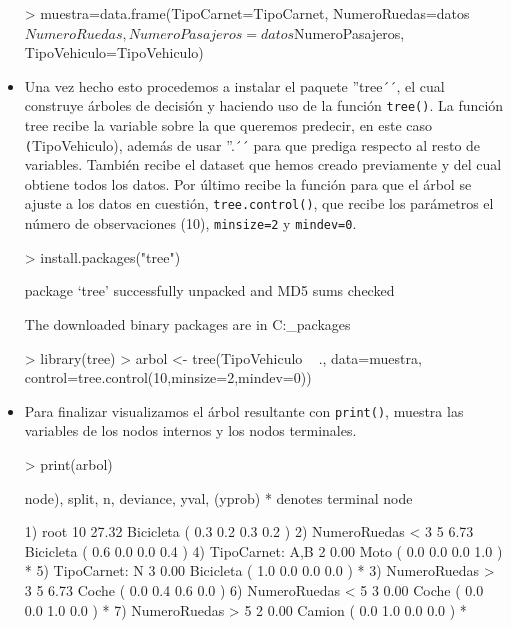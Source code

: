 \documentclass[a4paper, 12pt]{article}
\begin{document}
\begin{itemize}
\begin{Schunk}
\begin{Sinput}
> muestra=data.frame(TipoCarnet=TipoCarnet, NumeroRuedas=datos$NumeroRuedas, NumeroPasajeros=datos$NumeroPasajeros, TipoVehiculo=TipoVehiculo)
\end{Sinput}
\end{Schunk}
    \item Una vez hecho esto procedemos a instalar el paquete ''tree´´, el cual construye árboles de decisión y haciendo uso de la función \texttt{tree()}. La función tree recibe la variable sobre la que queremos predecir, en este caso \texttt(TipoVehiculo), además de usar ''.´´ para que prediga respecto al resto de variables. También recibe el dataset que hemos creado previamente y del cual obtiene todos los datos. Por último recibe la función para que el árbol se ajuste a los datos en cuestión, \texttt{tree.control()}, que recibe los parámetros el número de observaciones (10), \texttt{minsize=2} y \texttt{mindev=0}.
\begin{Schunk}
\begin{Sinput}
> install.packages("tree")
\end{Sinput}
\begin{Soutput}
package ‘tree’ successfully unpacked and MD5 sums checked

The downloaded binary packages are in
	C:\Users{}\AppData\Local\Temp\RtmpemczRZ\downloaded_packages
\end{Soutput}
\begin{Sinput}
> library(tree)
> arbol <- tree(TipoVehiculo ~ ., data=muestra, control=tree.control(10,minsize=2,mindev=0))
\end{Sinput}
\end{Schunk}
		\item Para finalizar visualizamos el árbol resultante con \texttt{print()}, muestra las variables de los nodos internos y  los nodos terminales.
\begin{Schunk}
\begin{Sinput}
> print(arbol)
\end{Sinput}
\begin{Soutput}
node), split, n, deviance, yval, (yprob)
      * denotes terminal node

1) root 10 27.32 Bicicleta ( 0.3 0.2 0.3 0.2 )  
  2) NumeroRuedas < 3 5  6.73 Bicicleta ( 0.6 0.0 0.0 0.4 )  
    4) TipoCarnet: A,B 2  0.00 Moto ( 0.0 0.0 0.0 1.0 ) *
    5) TipoCarnet: N 3  0.00 Bicicleta ( 1.0 0.0 0.0 0.0 ) *
  3) NumeroRuedas > 3 5  6.73 Coche ( 0.0 0.4 0.6 0.0 )  
    6) NumeroRuedas < 5 3  0.00 Coche ( 0.0 0.0 1.0 0.0 ) *
    7) NumeroRuedas > 5 2  0.00 Camion ( 0.0 1.0 0.0 0.0 ) *
\end{Soutput}
\end{Schunk}
		\end{itemize}
	
\end{document}
